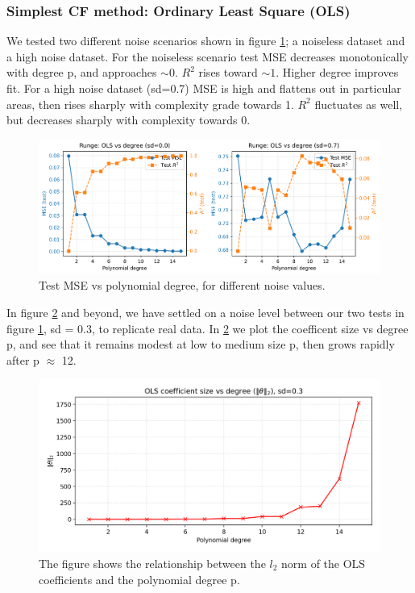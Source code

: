 \documentclass[amssymb,twocolumn,aps]{revtex4-2}
\begin{document}
\subsubsection{Simplest CF method: Ordinary Least Square (OLS)}

We tested two different noise scenarios shown in figure \ref{fig:ols_vs_degree};  a noiseless dataset and a high noise dataset. For the noiseless scenario test MSE decreases monotonically with degree p, and approaches $\sim 0$. $R^2$ rises toward $\sim 1$. Higher degree improves fit. For a high noise dataset (sd=0.7) MSE is high and flattens out in particular areas, then rises sharply with complexity grade towards 1. $R^2$ fluctuates as well, but decreases sharply with complexity towards 0. 

\begin{figure}[H]
    \centering
    \includegraphics[width=1\linewidth]{Project-1/Figures/runge_ols_mse_r2_vs_degree.png}
    \caption{Test MSE vs polynomial degree, for different noise values.}
    \label{fig:ols_vs_degree}
\end{figure}

In figure \ref{fig:norms_vs_degree} and beyond, we have settled on a noise level between our two tests in figure \ref{fig:ols_vs_degree}, sd = 0.3, to replicate real data. In \ref{fig:norms_vs_degree} we plot the coefficent size vs degree p, and see that it remains modest at low to medium size p, then grows rapidly after p $\approx$ 12. 

\begin{figure}[H]
    \centering
    \includegraphics[width=1\linewidth]{Project-1/Figures/runge_ols_theta_norms_vs_degree.png}
    \caption{The figure shows the relationship between the $l_2$ norm of the OLS coefficients and the polynomial degree p.}
    \label{fig:norms_vs_degree}
\end{figure}
\end{document}
